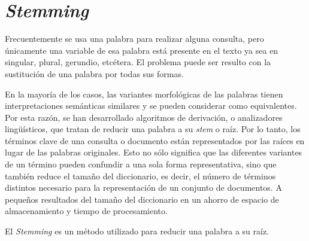 \section{\textit{Stemming}}
Frecuentemente se usa una palabra para realizar alguna consulta, pero \'unicamente una variable de esa palabra est\'a presente en el texto ya sea en singular, plural, gerundio, etc\'etera.  El problema puede ser resulto con la sustituci\'on de una palabra por todas sus formas.

En la mayor\'ia de los casos, las variantes morfol\'ogicas de las palabras tienen interpretaciones sem\'anticas similares y se pueden considerar como equivalentes. Por esta raz\'on, se han desarrollado algoritmos de derivaci\'on, o analizadores ling\"u\'isticos, que tratan de reducir una palabra a su \textit{stem} o ra\'iz. Por lo tanto, los t\'erminos clave de una consulta o documento est\'an representados por las ra\'ices en lugar de las palabras originales. Esto no s\'olo significa que las diferentes variantes de un t\'ermino pueden confundir a una sola forma representativa, sino que tambi\'en reduce el tama\~no del diccionario, es decir, el n\'umero de t\'erminos distintos necesario para la representaci\'on de un conjunto de documentos. A peque\~nos resultados del tama\~no del diccionario en un ahorro de espacio de almacenamiento y tiempo de procesamiento.

El \textit{Stemming} es un m\'etodo utilizado para reducir una palabra a su ra\'iz. \cite{stemm}

\pagebreak